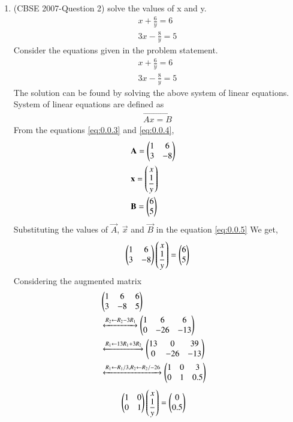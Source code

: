 \documentclass[journal,12pt,twocolumn]{IEEEtran}
\begin{document}
\begin{enumerate}
\item (CBSE 2007-Question 2)
solve the values of x and y.
\begin{align}
x+\displaystyle\frac{6}{y}=6  \\ 
3x-\displaystyle\frac{8}{y}=5
\end{align}
\solution Consider the equations  given in the problem statement.
\begin{align}
x+\displaystyle\frac{6}{y}=6 \label{eq:0.0.3}\\
3x-\displaystyle\frac{8}{y}=5 \label{eq:0.0.4}
\end{align}
The solution can be found by solving the above system of linear equations.\\ 
System of linear equations are defined as 
\begin{align}
\vec{Ax=B}\label{eq:0.0.5}
\end{align}
From the equations \eqref{eq:0.0.3} and \eqref{eq:0.0.4}, 
\begin{align}
&\vec{A}= \myvec{1 &6\\3  & -8}&\\
\medskip
&\vec{x}= \myvec{ x\\ \displaystyle\frac{1}{y}}&\\
\medskip
&\vec{B}= \myvec{6\\5} & 
\end{align} 
Substituting the values of $\vec{A}$, $\vec{x}$ and $\vec{B}$ in the equation \eqref{eq:0.0.5}
We get,
\begin{align}
\begin{pmatrix}1&6\\3&-8\end{pmatrix} \begin{pmatrix}x\\\displaystyle\frac{1}{y}\end{pmatrix}= \begin{pmatrix}6\\5\end{pmatrix}
\end{align}
Considering the augmented matrix 
 \begin{align}
  &\begin{pmatrix}1&6&6\\3&-8&5\end{pmatrix}&\\ 
& \xleftrightarrow[]{ R_2 \leftarrow R_2 - 3R_1}
  \begin{pmatrix}1&6&6\\0&-26&-13\end{pmatrix}&\\
  & \xleftrightarrow[]{ R_1 \leftarrow 13R_1 + 3R_2}
  \begin{pmatrix}13&0&39\\0&-26&-13\end{pmatrix}&\\
   & \xleftrightarrow[]{ R_1 \leftarrow R_1/3,R_2 \leftarrow R_2/-26}
  \begin{pmatrix}1&0&3\\0&1&0.5\end{pmatrix}&
 \end{align}
 \begin{align}
&\myvec{1&0\\0&1} \myvec{x\\\displaystyle\frac{1}{y}}= \myvec{0\\0.5}& \label{eq:0.0.14}

\end{align}
\end{enumerate}
\end{document}
